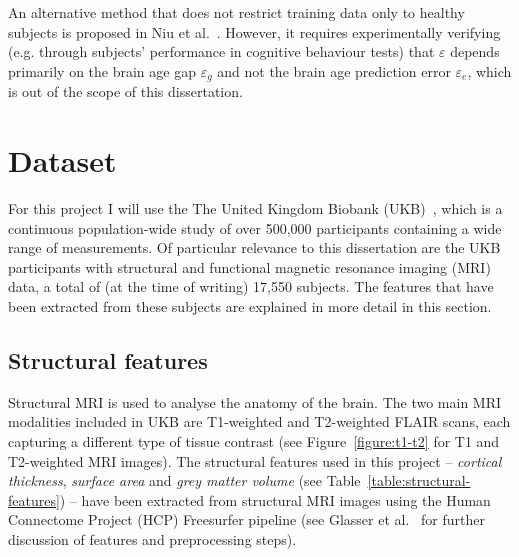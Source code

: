 An alternative method that does not restrict training data only to healthy subjects is proposed in Niu et al.~\cite{niu2019improved}. However, it requires experimentally verifying (e.g. through subjects' performance in cognitive behaviour tests) that $\varepsilon$ depends primarily on the brain age gap $\varepsilon_g$ and not the brain age prediction error $\varepsilon_e$, which is out of the scope of this dissertation.

\section{Dataset}
\label{dataset}

For this project I will use the The United Kingdom Biobank (UKB)~\cite{sudlow2015uk}, which is a continuous population-wide study of over 500,000 participants containing a wide range of measurements. Of particular relevance to this dissertation are the UKB participants with structural and functional magnetic resonance imaging (MRI) data, a total of (at the time of writing) 17,550 subjects. The features that have been extracted from these subjects are explained in more detail in this section. 


\subsection{Structural features}

Structural MRI is used to analyse the anatomy of the brain. The two main MRI modalities included in UKB are T1-weighted and T2-weighted FLAIR scans, each capturing a different type of tissue contrast (see Figure~\ref{figure:t1-t2} for T1 and T2-weighted MRI images). The structural features used in this project – \textit{cortical thickness}, \textit{surface area} and \textit{grey matter volume} (see Table~\ref{table:structural-features}) – have been extracted from structural MRI images using the Human Connectome Project (HCP) Freesurfer pipeline (see Glasser et al.~\cite{glasser2013minimal} for further discussion of features and preprocessing steps). 



